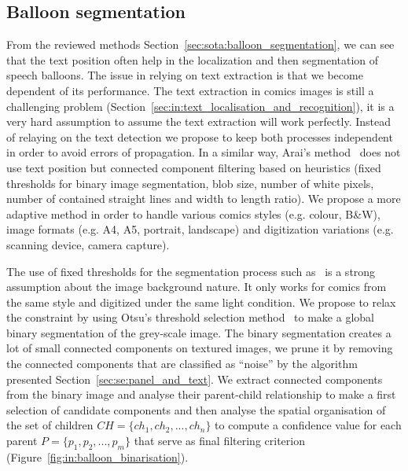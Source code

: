 \subsection{Balloon segmentation} %
\label{sub:in:balloon_segmentation}
From the reviewed methods Section~\ref{sec:sota:balloon_segmentation}, we can see that the text position often help in the localization and then segmentation of speech balloons.
The issue in relying on text extraction is that we become dependent of its performance.
The text extraction in comics images is still a challenging problem (Section~\ref{sec:in:text_localisation_and_recognition}), it is a very hard assumption to assume the text extraction will work perfectly. 
Instead of relaying on the text detection we propose to keep both processes independent in order to avoid errors of propagation.
In a similar way, Arai's method~\cite{Arai11} does not use text position but connected component filtering based on heuristics (fixed thresholds for binary image segmentation, blob size, number of white pixels, number of contained straight lines and width to length ratio). 
We propose a more adaptive method in order to handle various comics styles (e.g. colour, B\&W), image formats (e.g. A4, A5, portrait, landscape) and digitization variations (e.g. scanning device, camera capture).

The use of fixed thresholds for the segmentation process such as~\cite{Arai11} is a strong assumption about the image background nature.
It only works for comics from the same style and digitized under the same light condition.
We propose to relax the constraint by using Otsu's threshold selection method~\cite{otsu79} to make a global binary segmentation of the grey-scale image.
The binary segmentation creates a lot of small connected components on textured images, we prune it by removing the connected components that are classified as ``noise'' by the algorithm presented Section~\ref{sec:se:panel_and_text}.
We extract connected components from the binary image and analyse their parent-child relationship to make a first selection of candidate components and then analyse the spatial organisation of the set of children $CH=\{ch_1, ch_2,...,ch_n\}$ to compute a confidence value for each parent $P=\{p_1, p_2,...,p_m\}$ that serve as final filtering criterion (Figure~\ref{fig:in:balloon_binarisation}).


